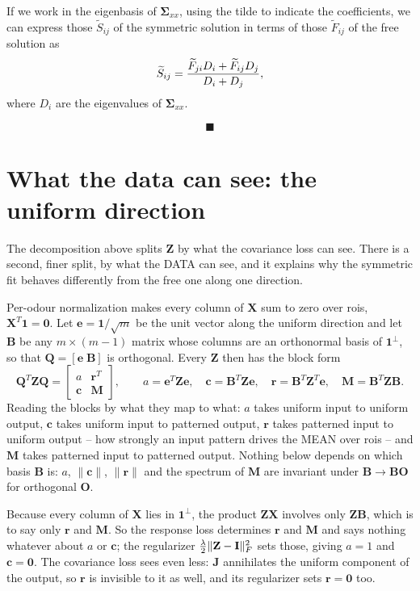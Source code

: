 \documentclass[10pt]{article}
\newcommand{\bSig}{\boldsymbol{\Sigma}}
\newcommand{\bzero}{\mathbf{0}}
\newcommand{\frob}[1]{\|#1\|_F^2}
\newcommand{\wt}[1]{\widetilde{#1}}
\newcommand{\XX}{\mathbf{X}}
\newcommand{\ZZ}{\mathbf{Z}}
\newcommand{\JJ}{\mathbf{J}}
\newcommand{\II}{\mathbf{I}}
\newcommand{\bone}{\mathbf{1}}
\newcommand{\la}{\lambda}
\newcommand{\cc}{\mathbf{c}}
\newcommand{\ee}{\mathbf{e}}
\newcommand{\rr}{\mathbf{r}}
\newcommand{\BB}{\mathbf{B}}
\newcommand{\MM}{\mathbf{M}}
\newcommand{\QQ}{\mathbf{Q}}
\newcommand{\OO}{\mathbf{O}}
\begin{document}
If we work in the eigenbasis of $\bSig_{xx}$,  using the tilde to indicate the coefficients, we can express those $\wt S_{ij}$ of the symmetric solution in terms of those $\wt F_{ij}$ of the free solution as $$ \wt{S}_{ij} = {\wt F_{ji} D_i + \wt F_{ij} D_j \over D_i + D_j},$$ where $D_i$ are the eigenvalues of $\bSig_{xx}$. 

$$\blacksquare$$

\section*{What the data can see: the uniform direction}

The decomposition above splits $\ZZ$ by what the covariance loss can see. There
is a second, finer split, by what the DATA can see, and it explains why the
symmetric fit behaves differently from the free one along one direction.

Per-odour normalization makes every column of $\XX$ sum to zero over rois,
$\XX^T \bone = \bzero$. Let $\ee = \bone / \sqrt{m}$ be the unit vector along the
uniform direction and let $\BB$ be any $m \times (m-1)$ matrix whose columns are
an orthonormal basis of $\bone^\perp$, so that $\QQ = [\ee \; \BB]$ is
orthogonal. Every $\ZZ$ then has the block form
$$ \QQ^T \ZZ \QQ = \begin{bmatrix} a & \rr^T \\ \cc & \MM \end{bmatrix}, \qquad
a = \ee^T \ZZ \ee, \quad \cc = \BB^T \ZZ \ee, \quad \rr = \BB^T \ZZ^T \ee,
\quad \MM = \BB^T \ZZ \BB. $$
Reading the blocks by what they map to what: $a$ takes uniform input to uniform
output, $\cc$ takes uniform input to patterned output, $\rr$ takes patterned
input to uniform output -- how strongly an input pattern drives the MEAN over
rois -- and $\MM$ takes patterned input to patterned output. Nothing below
depends on which basis $\BB$ is: $a$, $\|\cc\|$, $\|\rr\|$ and the spectrum of
$\MM$ are invariant under $\BB \to \BB \OO$ for orthogonal $\OO$.

Because every column of $\XX$ lies in $\bone^\perp$, the product $\ZZ \XX$
involves only $\ZZ \BB$, which is to say only $\rr$ and $\MM$. So the response
loss determines $\rr$ and $\MM$ and says nothing whatever about $a$ or $\cc$;
the regularizer $\half{\la}\frob{\ZZ - \II}$ sets those, giving $a = 1$ and
$\cc = \bzero$. The covariance loss sees even less: $\JJ$ annihilates the
uniform component of the output, so $\rr$ is invisible to it as well, and its
regularizer sets $\rr = \bzero$ too.
\end{document}
